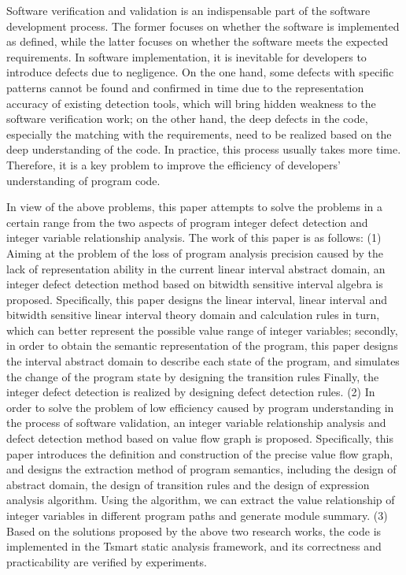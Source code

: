 \begin{abstract*}
	
Software verification and validation is an indispensable part of the software development process. The former focuses on whether the software is implemented as defined, while the latter focuses on whether the software meets the expected requirements. In software implementation, it is inevitable for developers to introduce defects due to negligence. On the one hand, some defects with specific patterns cannot be found and confirmed in time due to the representation accuracy of existing detection tools, which will bring hidden weakness to the software verification work; on the other hand, the deep defects in the code, especially the matching with the requirements, need to be realized based on the deep understanding of the code. In practice, this process usually takes more time. Therefore, it is a key problem to improve the efficiency of developers' understanding of program code.

In view of the above problems, this paper attempts to solve the problems in a certain range from the two aspects of program integer defect detection and integer variable relationship analysis. The work of this paper is as follows:
(1) Aiming at the problem of the loss of program analysis precision caused by the lack of representation ability in the current linear interval abstract domain, an integer defect detection method based on bitwidth sensitive interval algebra is proposed. Specifically, this paper designs the linear interval, linear interval and bitwidth sensitive linear interval theory domain and calculation rules in turn, which can better represent the possible value range of integer variables; secondly, in order to obtain the semantic representation of the program, this paper designs the interval abstract domain to describe each state of the program, and simulates the change of the program state by designing the transition rules Finally, the integer defect detection is realized by designing defect detection rules.
(2) In order to solve the problem of low efficiency caused by program understanding in the process of software validation, an integer variable relationship analysis and defect detection method based on value flow graph is proposed. Specifically, this paper introduces the definition and construction of the precise value flow graph, and designs the extraction method of program semantics, including the design of abstract domain, the design of transition rules and the design of expression analysis algorithm. Using the algorithm, we can extract the value relationship of integer variables in different program paths and generate module summary. (3) Based on the solutions proposed by the above two research works, the code is implemented in the Tsmart static analysis framework, and its correctness and practicability are verified by experiments.


\end{abstract*}
